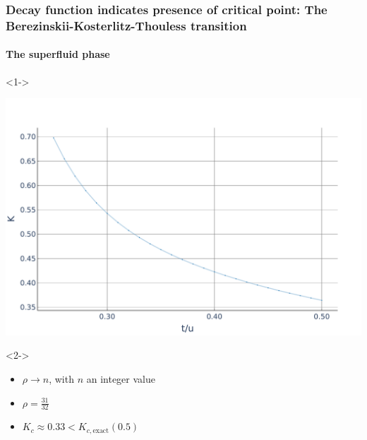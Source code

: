 \documentclass[aspectratio=169]{beamer}
\begin{document}
\begin{frame}
  \frametitle{Decay function indicates presence of critical point: The Berezinskii-Kosterlitz-Thouless transition}
  \framesubtitle{The superfluid phase}
  \begin{onlyenv}<1->
    \begin{center}
      \includegraphics[scale=0.2]{../img/Correlations-K-values.pdf}
    \end{center}
  \end{onlyenv}
  \begin{onlyenv}<2->
    \begin{itemize}
      \item<2-> $\rho \rightarrow n$, with $n$ an integer value 
      \item<3-> $\rho = \frac{31}{32}$
      \item<4-> $K_c \approx 0.33 < K_{c, \text{exact}} (0.5)$
    \end{itemize}
  \end{onlyenv}
\end{frame}
\end{document}
